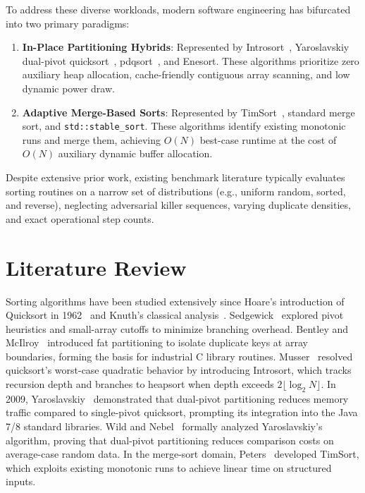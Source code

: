\documentclass[journal]{IEEEtran}
\begin{document}
To address these diverse workloads, modern software engineering has bifurcated into two primary paradigms:
\begin{enumerate}
    \item \textbf{In-Place Partitioning Hybrids}: Represented by Introsort~\cite{musser1997introspective}, Yaroslavskiy dual-pivot quicksort~\cite{yaroslavskiy2009dual}, pdqsort~\cite{peters2015pdqsort}, and Enesort. These algorithms prioritize zero auxiliary heap allocation, cache-friendly contiguous array scanning, and low dynamic power draw.
    \item \textbf{Adaptive Merge-Based Sorts}: Represented by TimSort~\cite{peters2002timsort}, standard merge sort, and \texttt{std::stable\_sort}. These algorithms identify existing monotonic runs and merge them, achieving $O(N)$ best-case runtime at the cost of $O(N)$ auxiliary dynamic buffer allocation.
\end{enumerate}

Despite extensive prior work, existing benchmark literature typically evaluates sorting routines on a narrow set of distributions (e.g., uniform random, sorted, and reverse), neglecting adversarial killer sequences, varying duplicate densities, and exact operational step counts. 

\section{Literature Review}
Sorting algorithms have been studied extensively since Hoare's introduction of Quicksort in 1962~\cite{hoare1962quicksort} and Knuth's classical analysis~\cite{knuth1998art}. Sedgewick~\cite{sedgewick1977analysis} explored pivot heuristics and small-array cutoffs to minimize branching overhead. Bentley and McIlroy~\cite{bentley1993engineering} introduced fat partitioning to isolate duplicate keys at array boundaries, forming the basis for industrial C library routines. Musser~\cite{musser1997introspective} resolved quicksort's worst-case quadratic behavior by introducing Introsort, which tracks recursion depth and branches to heapsort when depth exceeds $2 \lfloor \log_2 N \rfloor$. In 2009, Yaroslavskiy~\cite{yaroslavskiy2009dual} demonstrated that dual-pivot partitioning reduces memory traffic compared to single-pivot quicksort, prompting its integration into the Java 7/8 standard libraries. Wild and Nebel~\cite{wild2012average} formally analyzed Yaroslavskiy's algorithm, proving that dual-pivot partitioning reduces comparison costs on average-case random data. In the merge-sort domain, Peters~\cite{peters2002timsort} developed TimSort, which exploits existing monotonic runs to achieve linear time on structured inputs.
\end{document}
